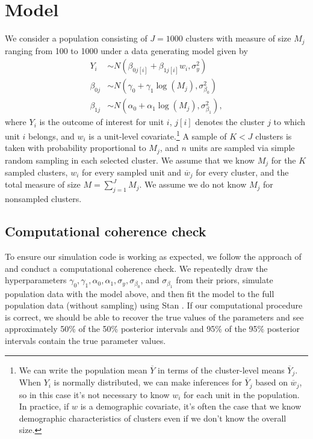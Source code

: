 \documentclass[12pt,a4paper]{article}
\begin{document}
\section*{Model}
We consider a population consisting of $J=1000$ clusters with measure of size $M_j$ ranging from 100 to 1000 under a data generating model given by
\begin{align*}
	Y_i &\sim N(\beta_{0j[i]} + \beta_{1j[i]} w_i, \sigma_y^2) \\
	\beta_{0j} &\sim N(\gamma_0 + \gamma_1 \log(M_j), \sigma_{\beta_0}^2)\\
	\beta_{1j} &\sim N(\alpha_0 + \alpha_1 \log(M_j), \sigma_{\beta_1}^2),
\end{align*}
where $Y_i$ is the outcome of interest for unit $i$, $j[i]$ denotes the cluster $j$ to which unit $i$ belongs, and $w_i$ is a unit-level covariate.\footnote{We can write the population mean $\overline{Y}$ in terms of the cluster-level means $\overline{Y}_j$. When $Y_i$ is normally distributed, we can make inferences for $\overline{Y}_j$ based on $\overline{w}_j$, so in this case it's not necessary to know $w_i$ for each unit in the population. In practice, if $w$ is a demographic covariate, it's often the case that we know demographic characteristics of clusters even if we don't know the overall size.} A sample of $K<J$ clusters is taken with probability proportional to $M_j$, and $n$ units are sampled via simple random sampling in each selected cluster. We assume that we know $M_j$ for the $K$ sampled clusters, $w_i$ for every sampled unit and $\overline{w}_j$ for every cluster, and the total measure of size $M = \sum_{j=1}^J M_j$. We assume we do not know $M_j$ for nonsampled clusters.

\subsection*{Computational coherence check}
To ensure our simulation code is working as expected, we follow the approach of \cite{cook2006} and conduct a computational coherence check. We repeatedly draw the hyperparameters $\gamma_0, \gamma_1, \alpha_0, \alpha_1, \sigma_y, \sigma_{\beta_0}$, and $\sigma_{\beta_1}$ from their priors, simulate population data with the model above, and then fit the model to the full population data (without sampling) using Stan \citep{stan}. If our computational procedure is correct, we should be able to recover the true values of the parameters and see approximately 50\% of the 50\% posterior intervals and 95\% of the 95\% posterior intervals contain the true parameter values.
\end{document}

